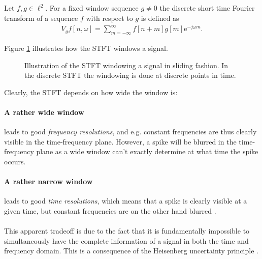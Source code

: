 \begin{definition}\label{def:stft_discrete}
Let $f,g\in\ell^2$. For a fixed window sequence $g\neq0$ the discrete short time Fourier transform of a sequence $f$ with respect to $g$ is defined as
\begin{align}
V_gf[n,\omega]=\sum_{m=-\infty}^{\infty}f[n+m]g[m]\mathrm{e}^{-j\omega m}.
\end{align}
\end{definition}
Figure \ref{fig:sliding_stft} illustrates how the STFT windows a signal.
\begin{figure}[H]
\centering
{}
\caption{Illustration of the STFT windowing a signal in sliding fashion. In the discrete STFT the windowing is done at discrete points in time.}
\label{fig:sliding_stft}
\end{figure}
Clearly, the STFT depends on how wide the window is:
\paragraph{A rather wide window} leads to good \textit{frequency resolutions}, and e.g. constant frequencies are thus clearly visible in the time-frequency plane. However, a spike will be blurred in the time-frequency plane as a wide window can't exactly determine at what time the spike occurs.
\paragraph{A rather narrow window} leads to good \textit{time resolutions}, which means that a spike is clearly visible at a given time, but constant frequencies are on the other hand blurred \cite{Davis}. \\ \\
This apparent tradeoff is due to the fact that it is fundamentally impossible to simultaneously have the complete information of a signal in both the time and frequency domain. This is a consequence of the Heisenberg uncertainty principle \cite{Wang}.


